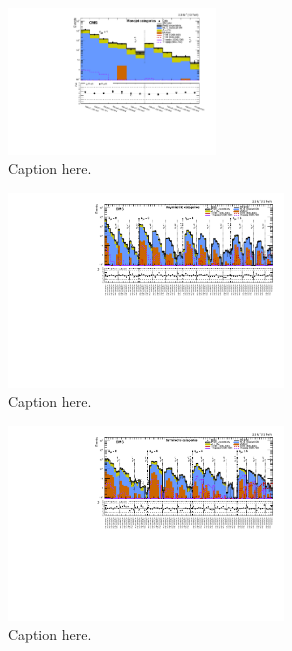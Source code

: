 \begin{figure}[!h]
  \begin{center}
    \includegraphics[width=0.49\textwidth]{figures/result/summaryPlot_Monojet_prefit_overlay_fit_b}
    \caption{Caption here.}
    \label{fig:mono}
  \end{center}
\end{figure}

\begin{figure}[!h]
  \begin{center}
    \includegraphics[angle=90,width=0.65\textwidth]{figures/result/summaryPlot_Asymmetric_prefit_overlay_fit_b}
    \caption{Caption here.}
    \label{fig:asym}
  \end{center}
\end{figure}

\begin{figure}[!h]
  \begin{center}
    \includegraphics[angle=90,width=0.65\textwidth]{figures/result/summaryPlot_Symmetric_prefit_overlay_fit_b}
    \caption{Caption here.}
    \label{fig:sym}
  \end{center}
\end{figure}


